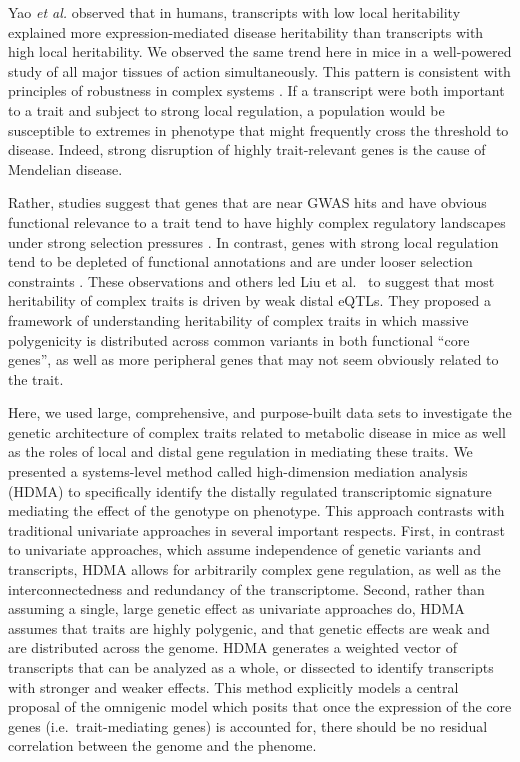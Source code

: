 \documentclass[
]{article}
\begin{document}
Yao \textit{et al.} \cite{pmid32424349} observed that in humans,
transcripts with low local heritability explained more
expression-mediated disease heritability than transcripts with high
local heritability. We observed the same trend here in mice in a
well-powered study of all major tissues of action simultaneously. This
pattern is consistent with principles of robustness in complex systems
\cite{pmid29782925, pmid12082173, pmid27304973}. If a transcript were
both important to a trait and subject to strong local regulation, a
population would be susceptible to extremes in phenotype that might
frequently cross the threshold to disease. Indeed, strong disruption of
highly trait-relevant genes is the cause of Mendelian disease.

Rather, studies suggest that genes that are near GWAS hits and have
obvious functional relevance to a trait tend to have highly complex
regulatory landscapes under strong selection pressures
\cite{pmid37857933}. In contrast, genes with strong local regulation
tend to be depleted of functional annotations and are under looser
selection constraints \cite{pmid37857933}. These observations and others
led Liu et al.~\cite{pmid31051098} to suggest that most heritability of
complex traits is driven by weak distal eQTLs. They proposed a framework
of understanding heritability of complex traits in which massive
polygenicity is distributed across common variants in both functional
``core genes'', as well as more peripheral genes that may not seem
obviously related to the trait.

Here, we used large, comprehensive, and purpose-built data sets to
investigate the genetic architecture of complex traits related to
metabolic disease in mice as well as the roles of local and distal gene
regulation in mediating these traits. We presented a systems-level
method called high-dimension mediation analysis (HDMA) to specifically
identify the distally regulated transcriptomic signature mediating the
effect of the genotype on phenotype. This approach contrasts with
traditional univariate approaches in several important respects. First,
in contrast to univariate approaches, which assume independence of
genetic variants and transcripts, HDMA allows for arbitrarily complex
gene regulation, as well as the interconnectedness and redundancy of the
transcriptome. Second, rather than assuming a single, large genetic
effect as univariate approaches do, HDMA assumes that traits are highly
polygenic, and that genetic effects are weak and are distributed across
the genome. HDMA generates a weighted vector of transcripts that can be
analyzed as a whole, or dissected to identify transcripts with stronger
and weaker effects. This method explicitly models a central proposal of
the omnigenic model which posits that once the expression of the core
genes (i.e.~trait-mediating genes) is accounted for, there should be no
residual correlation between the genome and the phenome.
\end{document}
